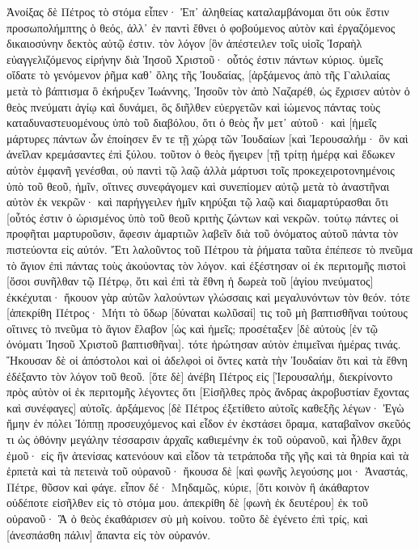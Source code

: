 Ἀνοίξας δὲ Πέτρος τὸ στόμα εἶπεν· Ἐπ᾽ ἀληθείας καταλαμβάνομαι ὅτι οὐκ ἔστιν προσωπολήμπτης ὁ θεός, 
ἀλλ᾽ ἐν παντὶ ἔθνει ὁ φοβούμενος αὐτὸν καὶ ἐργαζόμενος δικαιοσύνην δεκτὸς αὐτῷ ἐστιν. 
τὸν λόγον [ὃν ἀπέστειλεν τοῖς υἱοῖς Ἰσραὴλ εὐαγγελιζόμενος εἰρήνην διὰ Ἰησοῦ Χριστοῦ· οὗτός ἐστιν πάντων κύριος. 
ὑμεῖς οἴδατε τὸ γενόμενον ῥῆμα καθ᾽ ὅλης τῆς Ἰουδαίας, [ἀρξάμενος ἀπὸ τῆς Γαλιλαίας μετὰ τὸ βάπτισμα ὃ ἐκήρυξεν Ἰωάννης, 
Ἰησοῦν τὸν ἀπὸ Ναζαρέθ, ὡς ἔχρισεν αὐτὸν ὁ θεὸς πνεύματι ἁγίῳ καὶ δυνάμει, ὃς διῆλθεν εὐεργετῶν καὶ ἰώμενος πάντας τοὺς καταδυναστευομένους ὑπὸ τοῦ διαβόλου, ὅτι ὁ θεὸς ἦν μετ᾽ αὐτοῦ· 
καὶ [ἡμεῖς μάρτυρες πάντων ὧν ἐποίησεν ἔν τε τῇ χώρᾳ τῶν Ἰουδαίων [καὶ Ἰερουσαλήμ· ὃν καὶ ἀνεῖλαν κρεμάσαντες ἐπὶ ξύλου. 
τοῦτον ὁ θεὸς ἤγειρεν [τῇ τρίτῃ ἡμέρᾳ καὶ ἔδωκεν αὐτὸν ἐμφανῆ γενέσθαι, 
οὐ παντὶ τῷ λαῷ ἀλλὰ μάρτυσι τοῖς προκεχειροτονημένοις ὑπὸ τοῦ θεοῦ, ἡμῖν, οἵτινες συνεφάγομεν καὶ συνεπίομεν αὐτῷ μετὰ τὸ ἀναστῆναι αὐτὸν ἐκ νεκρῶν· 
καὶ παρήγγειλεν ἡμῖν κηρύξαι τῷ λαῷ καὶ διαμαρτύρασθαι ὅτι [οὗτός ἐστιν ὁ ὡρισμένος ὑπὸ τοῦ θεοῦ κριτὴς ζώντων καὶ νεκρῶν. 
τούτῳ πάντες οἱ προφῆται μαρτυροῦσιν, ἄφεσιν ἁμαρτιῶν λαβεῖν διὰ τοῦ ὀνόματος αὐτοῦ πάντα τὸν πιστεύοντα εἰς αὐτόν. 
Ἔτι λαλοῦντος τοῦ Πέτρου τὰ ῥήματα ταῦτα ἐπέπεσε τὸ πνεῦμα τὸ ἅγιον ἐπὶ πάντας τοὺς ἀκούοντας τὸν λόγον. 
καὶ ἐξέστησαν οἱ ἐκ περιτομῆς πιστοὶ [ὅσοι συνῆλθαν τῷ Πέτρῳ, ὅτι καὶ ἐπὶ τὰ ἔθνη ἡ δωρεὰ τοῦ [ἁγίου πνεύματος] ἐκκέχυται· 
ἤκουον γὰρ αὐτῶν λαλούντων γλώσσαις καὶ μεγαλυνόντων τὸν θεόν. τότε [ἀπεκρίθη Πέτρος· 
Μήτι τὸ ὕδωρ [δύναται κωλῦσαί] τις τοῦ μὴ βαπτισθῆναι τούτους οἵτινες τὸ πνεῦμα τὸ ἅγιον ἔλαβον [ὡς καὶ ἡμεῖς; 
προσέταξεν [δὲ αὐτοὺς [ἐν τῷ ὀνόματι Ἰησοῦ Χριστοῦ βαπτισθῆναι]. τότε ἠρώτησαν αὐτὸν ἐπιμεῖναι ἡμέρας τινάς. 
Ἤκουσαν δὲ οἱ ἀπόστολοι καὶ οἱ ἀδελφοὶ οἱ ὄντες κατὰ τὴν Ἰουδαίαν ὅτι καὶ τὰ ἔθνη ἐδέξαντο τὸν λόγον τοῦ θεοῦ. 
[ὅτε δὲ] ἀνέβη Πέτρος εἰς [Ἰερουσαλήμ, διεκρίνοντο πρὸς αὐτὸν οἱ ἐκ περιτομῆς 
λέγοντες ὅτι [Εἰσῆλθες πρὸς ἄνδρας ἀκροβυστίαν ἔχοντας καὶ συνέφαγες] αὐτοῖς. 
ἀρξάμενος [δὲ Πέτρος ἐξετίθετο αὐτοῖς καθεξῆς λέγων· 
Ἐγὼ ἤμην ἐν πόλει Ἰόππῃ προσευχόμενος καὶ εἶδον ἐν ἐκστάσει ὅραμα, καταβαῖνον σκεῦός τι ὡς ὀθόνην μεγάλην τέσσαρσιν ἀρχαῖς καθιεμένην ἐκ τοῦ οὐρανοῦ, καὶ ἦλθεν ἄχρι ἐμοῦ· 
εἰς ἣν ἀτενίσας κατενόουν καὶ εἶδον τὰ τετράποδα τῆς γῆς καὶ τὰ θηρία καὶ τὰ ἑρπετὰ καὶ τὰ πετεινὰ τοῦ οὐρανοῦ· 
ἤκουσα δὲ [καὶ φωνῆς λεγούσης μοι· Ἀναστάς, Πέτρε, θῦσον καὶ φάγε. 
εἶπον δέ· Μηδαμῶς, κύριε, [ὅτι κοινὸν ἢ ἀκάθαρτον οὐδέποτε εἰσῆλθεν εἰς τὸ στόμα μου. 
ἀπεκρίθη δὲ [φωνὴ ἐκ δευτέρου] ἐκ τοῦ οὐρανοῦ· Ἃ ὁ θεὸς ἐκαθάρισεν σὺ μὴ κοίνου. 
τοῦτο δὲ ἐγένετο ἐπὶ τρίς, καὶ [ἀνεσπάσθη πάλιν] ἅπαντα εἰς τὸν οὐρανόν. 
